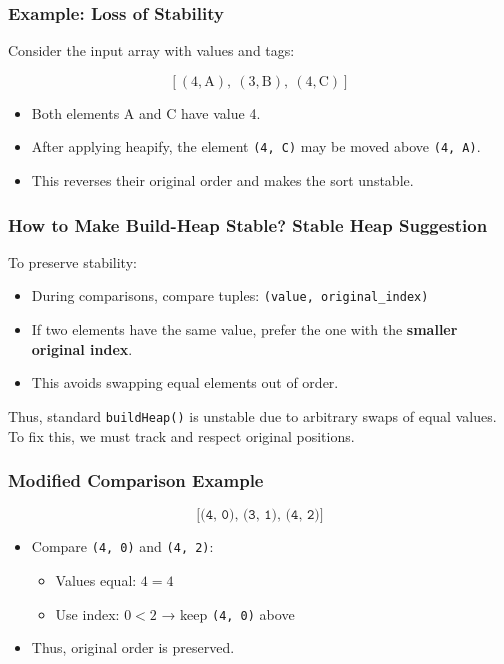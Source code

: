 \documentclass[14pt]{extarticle}
\begin{document}
\subsubsection*{Example: Loss of Stability}

Consider the input array with values and tags:

\[
[(4, \text{A}),\ (3, \text{B}),\ (4, \text{C})]
\]

\begin{itemize}
    \item Both elements A and C have value 4.
    \item After applying heapify, the element \texttt{(4, C)} may be moved above \texttt{(4, A)}.
    \item This reverses their original order and makes the sort unstable.
\end{itemize}

\subsubsection*{How to Make Build-Heap Stable? Stable Heap Suggestion}
To preserve stability:
\begin{itemize}
    \item During comparisons, compare tuples: \texttt{(value, original\_index)}
    \item If two elements have the same value, prefer the one with the \textbf{smaller original index}.
    \item This avoids swapping equal elements out of order.
\end{itemize}


\noindent
Thus, standard \texttt{buildHeap()} is unstable due to arbitrary swaps of equal values. To fix this, we must track and respect original positions.


\vspace{1em}

\subsubsection*{Modified Comparison Example}

\[
\texttt{[(4, 0), (3, 1), (4, 2)]}
\]

\begin{itemize}
    \item Compare \texttt{(4, 0)} and \texttt{(4, 2)}:
        \begin{itemize}
            \item Values equal: \(4 = 4\)
            \item Use index: \(0 < 2\) → keep \texttt{(4, 0)} above
        \end{itemize}
    \item Thus, original order is preserved.
\end{itemize}
\end{document}
